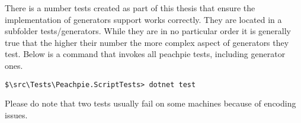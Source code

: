 There is a number tests created as part of this thesis that ensure the implementation of generators support works correctly. They are located in a subfolder tests/generators. While they are in no particular order it is generally true that the higher their number the more complex aspect of generators they test. Below is a command that invokes all peachpie tests, including generator ones.

\begin{verbatim}
$\src\Tests\Peachpie.ScriptTests> dotnet test
\end{verbatim}


Please do note that two tests usually fail on some machines because of encoding issues. 







